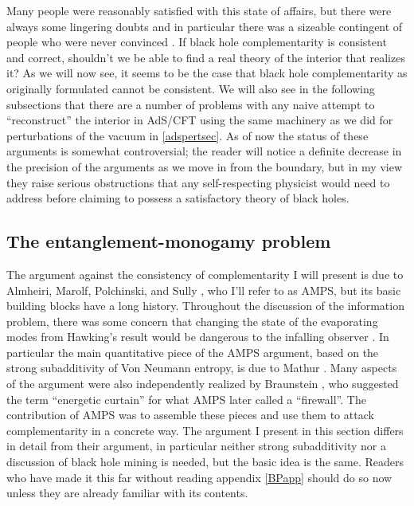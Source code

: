 \documentclass[12pt]{article}
\begin{document}
Many people were reasonably satisfied with this state of affairs, but there were always some lingering doubts and in particular there was a sizeable contingent of people who were never convinced \cite{Unruh:1995gn,Mathur:2009hf,Giddings:2011ks}.  If black hole complementarity is consistent and correct, shouldn't we be able to find a real theory of the interior that realizes it?  As we will now see, it seems to be the case that black hole complementarity as originally formulated cannot be consistent.  We will also see in the following subsections that there are a number of problems with any naive attempt to ``reconstruct'' the interior in AdS/CFT using the same machinery as we did for perturbations of the vacuum in \ref{adspertsec}.  As of now the status of these arguments is somewhat controversial; the reader will notice a definite decrease in the precision of the arguments as we move in from the boundary, but in my view they raise serious obstructions that any self-respecting physicist would need to address before claiming to possess a satisfactory theory of black holes.

\subsection{The entanglement-monogamy problem}\label{ampssec}
The argument against the consistency of complementarity I will present is due to Almheiri, Marolf, Polchinski, and Sully \cite{Almheiri:2012rt}, who I'll refer to as AMPS, but its basic building blocks have a long history.  Throughout the discussion of the information problem, there was some concern that changing the state of the evaporating modes from Hawking's result would be dangerous to the infalling observer \cite{Giddings:1994pj,Polchinski:1995ta,Mathur:2009hf,Giddings:2011ks,Avery:2011nb}.  In particular the main quantitative piece of the AMPS argument, based on the strong subadditivity of Von Neumann entropy, is due to Mathur \cite{Mathur:2009hf}.  Many aspects of the argument were also independently realized by Braunstein \cite{Braunstein:2009my}, who suggested the term ``energetic curtain'' for what AMPS later called a ``firewall''.  The contribution of AMPS was to assemble these pieces and use them to attack complementarity in a concrete way.  The argument I present in this section differs in detail from their argument, in particular neither strong subadditivity nor a discussion of black hole mining \cite{Brown:2012un} is needed, but the basic idea is the same.  Readers who have made it this far without reading appendix \ref{BPapp} should do so now unless they are already familiar with its contents.
\end{document}
